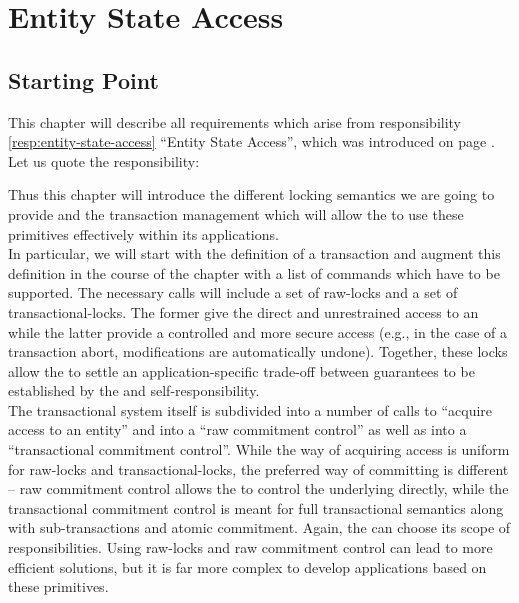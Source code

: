 \documentclass[a4paper, 12pt]{book}
\begin{document}
\chapter{Entity State Access}
\label{sec:entity-state-access}

\section{Starting Point}

This chapter will describe all requirements which arise from 
responsibility \ref{resp:entity-state-access} ``Entity State Access'', which
was introduced on page \pageref{resp:entity-state-access}. Let us quote
the responsibility:
\begin{quote}
  \respentityaccess
\end{quote}
%
Thus this chapter will introduce the different locking semantics we are going
to provide and the transaction management which will allow the  to
use these primitives effectively within its applications.\\
%
In particular, we will start with the definition of a transaction and augment
this definition in the course of the chapter with a list of commands which
have to be supported. 
%
The necessary calls will include a set of raw-locks and a set of
transactional-locks. 
%
The former give the  direct and unrestrained access to an
 while 
%
the latter provide a controlled and more secure access (e.g., in the
case of a transaction abort, modifications are automatically
undone). 
%
Together, these locks allow the  to settle an
application-specific trade-off between guarantees to be established by
the \SYNEIGHT and self-responsibility.\\
%
The transactional system itself is subdivided into a number of calls to
``acquire access to an entity'' and into a ``raw commitment control'' as well
as into a ``transactional commitment control''. While the way of acquiring
access is uniform for raw-locks and transactional-locks, the preferred way of
committing is different -- raw commitment control allows the  to
control the underlying  directly, while the transactional commitment
control is meant for full transactional semantics along with sub-transactions
and atomic commitment. 
%
Again, the  can choose its scope of responsibilities. Using
raw-locks and raw commitment control can lead to more efficient solutions, but
it is far more complex to develop applications based on these primitives. 
\end{document}
